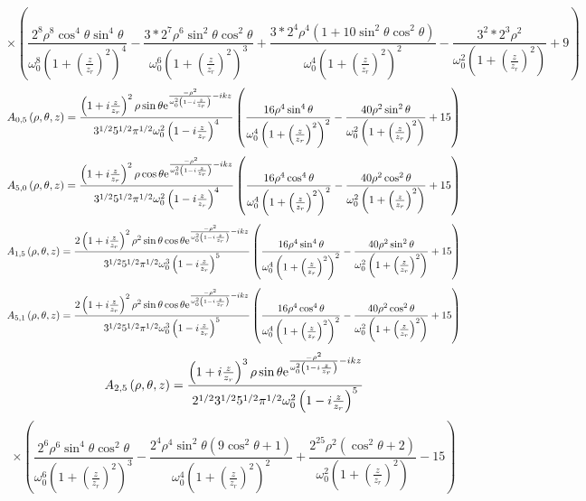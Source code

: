 \documentclass[11pt]{amsart}
\makeatletter
\newcommand{\e}{{\rm e}}				%
\newcommand{\0}{\varnothing}		%
\newcommand{\1}{!}
\newcommand{\2}{@}
\newcommand{\3}{\#}
\newcommand{\4}{\$}
\newcommand{\5}{\%}
\newcommand{\6}{$^\wedge$}
\newcommand{\7}{\&}
\newcommand{\8}{*}
\newcommand{\9}{(}
\makeatother
\begin{document}
\[
\times\left(\frac{2^8\rho^8\cos^4\theta\sin^4\theta}{\omega_0^8\left(1+\left(\frac{z}{z_r}\right)^2\right)^4}-\frac{3*2^7\rho^6\sin^2\theta\cos^2\theta}{\omega_0^6\left(1+\left(\frac{z}{z_r}\right)^2\right)^3}+\frac{3*2^4\rho^4\left(1+ 10\sin^2\theta\cos^2\theta\right)}{\omega_0^4\left(1+\left(\frac{z}{z_r}\right)^2\right)^2}-\frac{3^2*2^3\rho^2}{\omega_0^2\left(1+\left(\frac{z}{z_r}\right)^2\right)}+9\right)
\]
\[
A_{0,5} \left(\rho,\theta,z\right) = \frac{\left(1+i\frac{z}{z_r}\right)^2\rho \sin \theta \e^{\frac{-\rho^2}{\omega_0^2\left(1-i\frac{z}{z_r}\right)}-ikz}}{3^{1/2}5^{1/2}\pi^{1/2}\omega_0^2\left(1-i\frac{z}{z_r}\right)^4}\left(\frac{16\rho^4\sin^4 \theta}{\omega_0^4\left(1+\left(\frac{z}{z_r}\right)^2\right)^2}-\frac{40\rho^2\sin^2\theta}{\omega_0^2\left(1+\left(\frac{z}{z_r}\right)^2\right)}+15\right)
\]
\[
A_{5,0} \left(\rho,\theta,z\right) = \frac{\left(1+i\frac{z}{z_r}\right)^2\rho \cos \theta \e^{\frac{-\rho^2}{\omega_0^2\left(1-i\frac{z}{z_r}\right)}-ikz}}{3^{1/2}5^{1/2}\pi^{1/2}\omega_0^2\left(1-i\frac{z}{z_r}\right)^4}\left(\frac{16\rho^4\cos^4 \theta}{\omega_0^4\left(1+\left(\frac{z}{z_r}\right)^2\right)^2}-\frac{40\rho^2\cos^2\theta}{\omega_0^2\left(1+\left(\frac{z}{z_r}\right)^2\right)}+15\right)
\]
\[
A_{1,5}\left(\rho,\theta,z\right) = \frac{2\left(1+i\frac{z}{z_r}\right)^2\rho^2 \sin \theta \cos \theta\e^{\frac{-\rho^2}{\omega_0^2\left(1-i\frac{z}{z_r}\right)}-ikz}}{3^{1/2}5^{1/2}\pi^{1/2}\omega_0^3\left(1-i\frac{z}{z_r}\right)^5}\left(\frac{16\rho^4\sin^4 \theta}{\omega_0^4\left(1+\left(\frac{z}{z_r}\right)^2\right)^2}-\frac{40\rho^2\sin^2\theta}{\omega_0^2\left(1+\left(\frac{z}{z_r}\right)^2\right)}+15\right)
\]
\[
A_{5,1}\left(\rho,\theta,z\right) = \frac{2\left(1+i\frac{z}{z_r}\right)^2\rho^2 \sin \theta \cos \theta\e^{\frac{-\rho^2}{\omega_0^2\left(1-i\frac{z}{z_r}\right)}-ikz}}{3^{1/2}5^{1/2}\pi^{1/2}\omega_0^3\left(1-i\frac{z}{z_r}\right)^5}\left(\frac{16\rho^4\cos^4 \theta}{\omega_0^4\left(1+\left(\frac{z}{z_r}\right)^2\right)^2}-\frac{40\rho^2\cos^2\theta}{\omega_0^2\left(1+\left(\frac{z}{z_r}\right)^2\right)}+15\right)
\]
\[
A_{2,5} \left(\rho,\theta,z\right) = \frac{\left(1+i\frac{z}{z_r}\right)^3\rho \sin \theta\e^{\frac{-\rho^2}{\omega_0^2\left(1-i\frac{z}{z_r}\right)}-ikz}}{2^{1/2}3^{1/2}5^{1/2}\pi^{1/2}\omega_0^2\left(1-i\frac{z}{z_r}\right)^5}
\]
\[
\times\left(\frac{2^6\rho^6\sin^4\theta \cos^2\theta}{\omega_0^6\left(1+\left(\frac{z}{z_r}\right)^2\right)^3}-\frac{2^4\rho^4\sin^2\theta\left(9\cos^2\theta+1\right)}{\omega_0^4\left(1+\left(\frac{z}{z_r}\right)^2\right)^2}+\frac{2^25\rho^2\left(\cos^2\theta + 2\right)}{\omega_0^2\left(1+\left(\frac{z}{z_r}\right)^2\right)}-15\right)
\]
\end{document}
